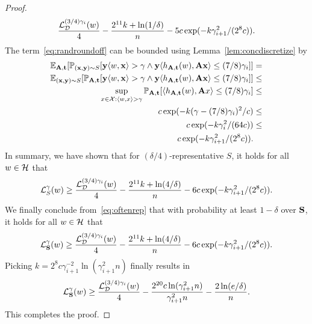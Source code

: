 \begin{proof}
\begin{align*}
\frac{\mathcal{L}_{ \mathcal{D}}^{(3/4)\gamma_i}(w)}{4} - \frac{2^{11} k + \ln(1/\delta)}{n} -5c \exp(-k \gamma_{i+1}^2/(2^{8}c)).
\end{align*}
The term~\eqref{eq:randroundoff} can be bounded using Lemma~\ref{lem:concdiscretize} by
\begin{align*}
\mathbb{E}_{\mathbf{A},\mathbf{t}}[\mathbb{P}_{(\mathbf{x},\mathbf{y})\sim S}[\mathbf{y} \langle w, \mathbf{x} \rangle > \gamma \wedge \mathbf{y} \langle h_{\mathbf{A},\mathbf{t}}(w), \mathbf{A} \mathbf{x} \rangle \leq (7/8)\gamma_i]] &= \\
\mathbb{E}_{(\mathbf{x},\mathbf{y})\sim S}[\mathbb{P}_{\mathbf{A},\mathbf{t}}[\mathbf{y} \langle w, \mathbf{x} \rangle > \gamma \wedge \mathbf{y} \langle h_{\mathbf{A},\mathbf{t}}(w), \mathbf{A} \mathbf{x} \rangle \leq (7/8)\gamma_i]] &\leq \\
\sup_{x \in \mathcal{X} : \langle w, x\rangle > \gamma }\mathbb{P}_{\mathbf{A},\mathbf{t}}[\langle h_{\mathbf{A},\mathbf{t}}(w), \mathbf{A} x \rangle \leq (7/8)\gamma_i] &\leq\\
c\exp(-k(\gamma - (7/8)\gamma_i)^2/c) &\leq \\
c\exp(-k\gamma_i^2/(64 c))&\leq \\
c\exp(-k\gamma_{i+1}^2/(2^{8}c)).
\end{align*}
In summary, we have shown that for $(\delta/4)$-representative $S$, it holds for all $w \in \mathcal{H}$ that
\begin{align*}
    \mathcal{L}_S^\gamma(w) \geq \frac{\mathcal{L}_{ \mathcal{D}}^{(3/4)\gamma_i}(w)}{4} - \frac{2^{11} k + \ln(4/\delta)}{n} -6c \exp(-k \gamma_{i+1}^2/(2^{8}c)).
\end{align*}
We finally conclude from~\eqref{eq:oftenrep} that with probability at least $1-\delta$ over $\mathbf{S}$, it holds for all $w \in \mathcal{H}$ that
\begin{align*}
    \mathcal{L}_{\mathbf{S}}^\gamma(w) \geq \frac{\mathcal{L}_{ \mathcal{D}}^{(3/4)\gamma_i}(w)}{4} - \frac{2^{11} k + \ln(4/\delta)}{n} -6c \exp(-k \gamma_{i+1}^2/(2^{8}c)).
\end{align*}
Picking $k=2^{8}c \gamma_{i+1}^{-2} \ln(\gamma^2_{i+1} n)$ finally results in
\begin{align*}
    \mathcal{L}_{\mathbf{S}}^\gamma(w) \geq \frac{\mathcal{L}_{ \mathcal{D}}^{(3/4)\gamma_i}(w)}{4} - \frac{2^{20}c \ln(\gamma_{i+1}^2 n)}{\gamma_{i+1}^2 n} - \frac{2\ln(e/\delta)}{n}.
\end{align*}
This completes the proof.
\end{proof}